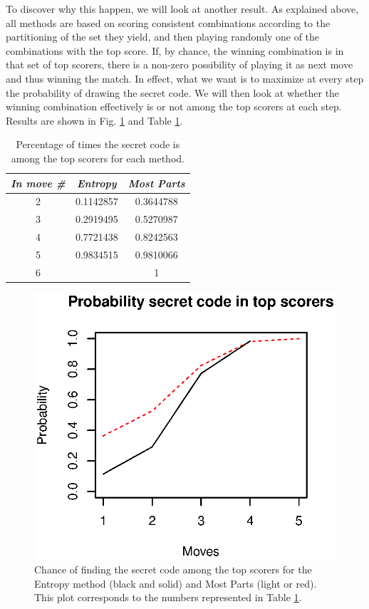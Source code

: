 \documentclass[preprint,12pt]{elsarticle}
\begin{document}
To discover why this happen, we will look at another result. As explained above,
all methods are based on scoring consistent combinations according to
the partitioning of the set they yield, and then playing randomly one
of the combinations with the top score. If, by chance, the winning
combination is in that set of top scorers, there is a non-zero
possibility of playing it as next move and thus winning the match. In
effect, what we want is to maximize at every step the probability of
drawing the secret code. We
will then look at whether the winning combination effectively is or
not among the top scorers at each step. Results are shown in Fig. 
\ref{fig:top:me} and Table \ref{tab:top:me}.

\begin{table}[!htb]
\centering
\caption{Percentage of times the secret code is among the top scorers for
  each method.\label{tab:top:me}}
\smallskip
\begin{tabular}{|c|c|c|}
\hline
\emph{In move \#} & \emph{Entropy} & \emph{Most Parts} \\
\hline
2 & 0.1142857  & 0.3644788\\
3 & 0.2919495 & 0.5270987 \\
4 & 0.7721438 & 0.8242563 \\ 
5 & 0.9834515 &  0.9810066\\
6 & & 1 \\
\hline
\end{tabular}
\end{table}
%
\begin{figure}[!htb]
\centering\smallskip
\includegraphics{top-me.eps}
\caption{Chance of finding the secret code among the top scorers for the
  Entropy method (black and solid) and Most Parts (light or
  red). This plot corresponds to the numbers represented in Table
  \ref{tab:top:me}.\label{fig:top:me}}
\end{figure} 
\end{document}
